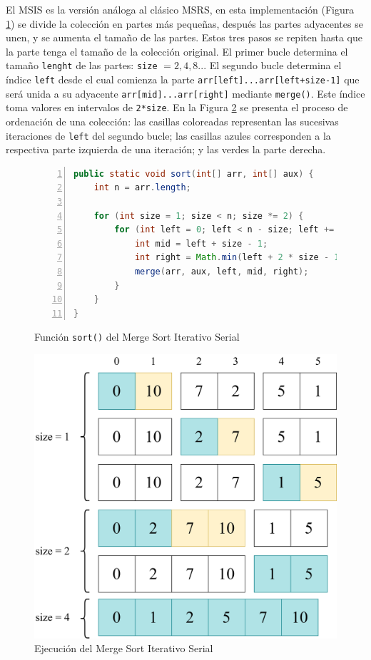\documentclass[titlepage]{article}
\begin{document}
El MSIS es la versión análoga al clásico MSRS, en esta implementación (Figura \ref{fig:MSIS_sort()}) se divide la colección en partes más pequeñas, después las partes adyacentes se unen, y se aumenta el tamaño  de las partes. Estos tres pasos se repiten hasta que la parte tenga el tamaño de la colección original. El primer bucle determina el tamaño \lstinline{lenght} de las partes: \lstinline{size} \(=2, 4, 8..\). El segundo bucle determina el índice \lstinline{left} desde el cual comienza la parte \lstinline{arr[left]...arr[left+size-1]} que será unida a su adyacente \lstinline{arr[mid]...arr[right]} mediante \lstinline{merge()}. Este índice toma valores en intervalos de \lstinline{2*size}. En la Figura \ref{fig:ejecuciónMSIS} se presenta el proceso de ordenación de una colección: las casillas coloreadas representan las sucesivas iteraciones de \lstinline{left} del segundo bucle; las casillas azules corresponden a la respectiva parte izquierda de una iteración; y las verdes la parte derecha.

\begin{figure}[hbtp]
    \begin{lstlisting}[language=java, frame=single, numbers=left]
public static void sort(int[] arr, int[] aux) {
	int n = arr.length;
	
	for (int size = 1; size < n; size *= 2) {
		for (int left = 0; left < n - size; left += 2 * size) {
			int mid = left + size - 1;
			int right = Math.min(left + 2 * size - 1, n - 1);
			merge(arr, aux, left, mid, right);
		}
	}
}
    \end{lstlisting}
    \caption{Función \lstinline{sort()} del Merge Sort Iterativo Serial}
    \label{fig:MSIS_sort()}
\end{figure}

\begin{figure}
    \centering
    \includegraphics[width=0.5\linewidth]{Diagrames/ejecucionMSIS.png}
    \caption{Ejecución del Merge Sort Iterativo Serial}
    \label{fig:ejecuciónMSIS}
\end{figure}
\end{document}
